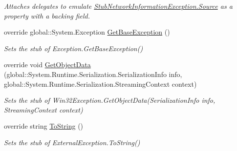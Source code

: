 \begin{DoxyCompactItemize}
\begin{DoxyCompactList}\small\item\em Attaches delegates to emulate \hyperlink{class_system_1_1_net_1_1_network_information_1_1_fakes_1_1_stub_network_information_exception_a8722dd8a1a22e9705f876c28a704ae56}{Stub\-Network\-Information\-Exception.\-Source} as a property with a backing field.\end{DoxyCompactList}\item 
override global\-::\-System.\-Exception \hyperlink{class_system_1_1_net_1_1_network_information_1_1_fakes_1_1_stub_network_information_exception_a963acd4890d64a9c5c99383738161d5b}{Get\-Base\-Exception} ()
\begin{DoxyCompactList}\small\item\em Sets the stub of Exception.\-Get\-Base\-Exception()\end{DoxyCompactList}\item 
override void \hyperlink{class_system_1_1_net_1_1_network_information_1_1_fakes_1_1_stub_network_information_exception_a3f30e6d8f3b97d5b14b4cdb357ac2944}{Get\-Object\-Data} (global\-::\-System.\-Runtime.\-Serialization.\-Serialization\-Info info, global\-::\-System.\-Runtime.\-Serialization.\-Streaming\-Context context)
\begin{DoxyCompactList}\small\item\em Sets the stub of Win32\-Exception.\-Get\-Object\-Data(\-Serialization\-Info info, Streaming\-Context context)\end{DoxyCompactList}\item 
override string \hyperlink{class_system_1_1_net_1_1_network_information_1_1_fakes_1_1_stub_network_information_exception_ab686285d24d33cdb396f3b7add9aaf2f}{To\-String} ()
\begin{DoxyCompactList}\small\item\em Sets the stub of External\-Exception.\-To\-String()\end{DoxyCompactList}\end{DoxyCompactItemize}
